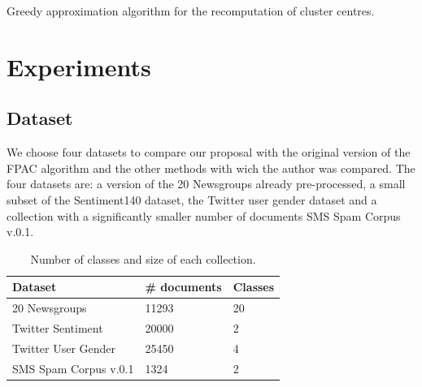 \documentclass[runningheads]{llncs}
\begin{document}
\begin{algorithm}
\begin{algorithmic}
\ENDWHILE
\ENDFOR

\caption{Greedy approximation algorithm for the recomputation of cluster centres.\label{alg1}}
\end{algorithmic}
\end{algorithm}




\section{Experiments}

\subsection{Dataset}

We choose four datasets to compare our proposal with the original 
version of the FPAC algorithm and the other methods with wich the author was compared.
The four datasets are: a version of the 20 Newsgroups\cite{2007:phd-Ana-Cardoso-Cachopo} already pre-processed,
a small subset of the Sentiment140 dataset\cite{sentiment140},
the Twitter user gender dataset\cite{eight_2016} and a collection
with a significantly smaller number of documents SMS Spam Corpus v.0.1\cite{hidalgo}.

\begin{table}[]
\centering
    \begin{tabular}{|l|l|l|}
    \hline
    Dataset               & \# documents & Classes \\ \hline
    20 Newsgroups\cite{2007:phd-Ana-Cardoso-Cachopo}         & 11293       & 20      \\ \hline
    Twitter Sentiment \cite{sentiment140}     & 20000       & 2       \\ \hline
    Twitter User Gender \cite{eight_2016}   & 25450       & 4       \\ \hline
    SMS Spam Corpus v.0.1 \cite{hidalgo} & 1324        & 2       \\ \hline
    \end{tabular}
    \caption{Number of classes and size of each collection.}
    \end{table}
\end{document}
